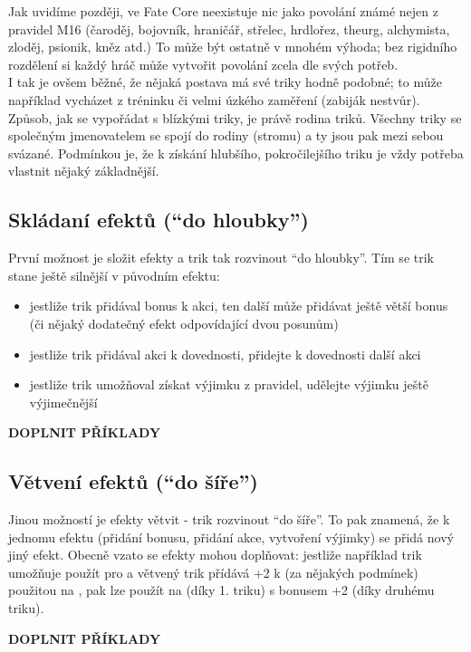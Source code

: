 \documentclass[../main.tex]{subfiles}
\begin{document}
Jak uvidíme později, ve Fate Core neexistuje nic jako povolání známé nejen z pravidel M16 (čaroděj, bojovník, hraničář, střelec, hrdlořez, theurg, alchymista, zloděj, psionik, kněz atd.) To může být ostatně v mnohém výhoda; bez rigidního rozdělení si každý hráč může vytvořit povolání zcela dle svých potřeb. \\
I tak je ovšem běžné, že nějaká postava má své triky hodně podobné; to může například vycházet z tréninku či velmi úzkého zaměření (zabiják nestvůr). Způsob, jak se vypořádat s blízkými triky, je právě rodina triků. Všechny triky se společným jmenovatelem se spojí do rodiny (stromu) a ty jsou pak mezi sebou svázané. Podmínkou je, že k získání hlubšího, pokročilejšího triku je vždy potřeba vlastnit nějaký základnější.

\subsection{Skládaní efektů (``do hloubky'')}
\label{sec:trik-skladani}
První možnost je složit efekty a trik tak rozvinout ``do hloubky''. Tím se trik stane ještě silnější v původním efektu:

\begin{itemize}
\item jestliže trik přidával bonus k akci, ten další může přidávat ještě větší bonus (či nějaký dodatečný efekt odpovídající dvou posunům)
\item jestliže trik přidával akci k dovednosti, přidejte k dovednosti další akci
\item jestliže trik umožňoval získat výjimku z pravidel, udělejte výjimku ještě výjimečnější
\end{itemize}

\textbf{DOPLNIT PŘÍKLADY}

\subsection{Větvení efektů (``do šíře'')}
\label{sec:trik-vetveni}
Jinou možností je efekty větvit - trik rozvinout ``do šíře''. To pak znamená, že k jednomu efektu (přidání bonusu, přidání akce, vytvoření výjimky) se přidá nový jiný efekt. Obecně vzato se efekty mohou doplňovat: jestliže například trik umožňuje použít  pro  a větvený trik přídává +2 k  (za nějakých podmínek) použitou na , pak lze použít  na  (díky 1. triku) s bonusem +2 (díky druhému triku).

\textbf{DOPLNIT PŘÍKLADY}
\end{document}
